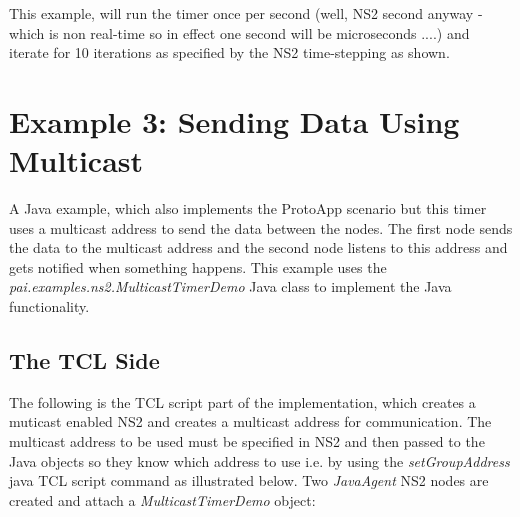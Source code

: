 This example, will run the timer once per second (well, NS2 second anyway - 
which is non real-time so in effect one second will be microseconds ....) and
iterate for 10 iterations as specified by the NS2 time-stepping as shown.


\section{Example 3: Sending Data Using Multicast}
\label{jni:multicast}

A Java example, which also implements the ProtoApp
scenario but this timer uses a multicast address
to send the data between the nodes.  The first node
sends the data to the multicast address and the second
node listens to this address and gets notified when 
something happens.  This example uses the
\emph{pai.examples.ns2.MulticastTimerDemo} Java class
to implement the Java functionality.


\subsection{The TCL Side}
\label{jni:tclside}

The following is the TCL script part of the implementation, which creates
a muticast enabled NS2 and creates a multicast address for 
communication.  The multicast address to be used must be specified in 
NS2 and then passed to the Java objects so they know which address 
to use i.e. by using the \emph{setGroupAddress} java TCL script 
command as illustrated below. Two \emph{JavaAgent} NS2 nodes are
created and attach a \emph{MulticastTimerDemo} object: 

